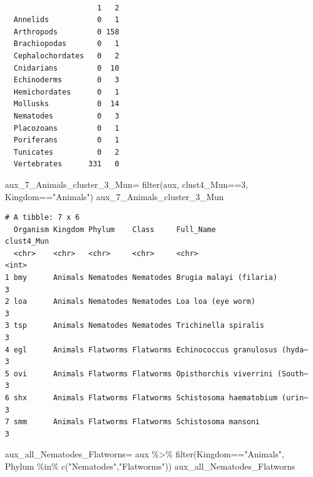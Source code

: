 \documentclass[
  letterpaper,
  DIV=11,
  numbers=noendperiod]{scrreprt}
\newenvironment{Shaded}{}{}
\newcommand{\DecValTok}[1]{\textcolor[rgb]{0.82,0.60,0.40}{#1}}
\newcommand{\FunctionTok}[1]{\textcolor[rgb]{0.38,0.69,0.94}{#1}}
\newcommand{\NormalTok}[1]{\textcolor[rgb]{0.67,0.70,0.75}{#1}}
\newcommand{\OtherTok}[1]{\textcolor[rgb]{0.15,0.68,0.38}{#1}}
\newcommand{\SpecialCharTok}[1]{\textcolor[rgb]{0.34,0.71,0.76}{#1}}
\newcommand{\StringTok}[1]{\textcolor[rgb]{0.60,0.76,0.47}{#1}}
\begin{document}
\begin{verbatim}
                  
                     1   2
  Annelids           0   1
  Arthropods         0 158
  Brachiopodas       0   1
  Cephalochordates   0   2
  Cnidarians         0  10
  Echinoderms        0   3
  Hemichordates      0   1
  Mollusks           0  14
  Nematodes          0   3
  Placozoans         0   1
  Poriferans         0   1
  Tunicates          0   2
  Vertebrates      331   0
\end{verbatim}

\begin{Shaded}
\begin{Highlighting}[]
\NormalTok{aux\_7\_Animals\_cluster\_3\_Mun}\OtherTok{=} \FunctionTok{filter}\NormalTok{(aux,}
\NormalTok{                                clust4\_Mun}\SpecialCharTok{==}\DecValTok{3}\NormalTok{,}
\NormalTok{                                Kingdom}\SpecialCharTok{==}\StringTok{"Animals"}\NormalTok{)}
\NormalTok{aux\_7\_Animals\_cluster\_3\_Mun}
\end{Highlighting}
\end{Shaded}

\begin{verbatim}
# A tibble: 7 x 6
  Organism Kingdom Phylum    Class     Full_Name                      clust4_Mun
  <chr>    <chr>   <chr>     <chr>     <chr>                               <int>
1 bmy      Animals Nematodes Nematodes Brugia malayi (filaria)                 3
2 loa      Animals Nematodes Nematodes Loa loa (eye worm)                      3
3 tsp      Animals Nematodes Nematodes Trichinella spiralis                    3
4 egl      Animals Flatworms Flatworms Echinococcus granulosus (hyda~          3
5 ovi      Animals Flatworms Flatworms Opisthorchis viverrini (South~          3
6 shx      Animals Flatworms Flatworms Schistosoma haematobium (urin~          3
7 smm      Animals Flatworms Flatworms Schistosoma mansoni                     3
\end{verbatim}

\begin{Shaded}
\begin{Highlighting}[]
\NormalTok{aux\_all\_Nematodes\_Flatworns}\OtherTok{=}\NormalTok{ aux }\SpecialCharTok{\%\textgreater{}\%} 
  \FunctionTok{filter}\NormalTok{(Kingdom}\SpecialCharTok{==}\StringTok{"Animals"}\NormalTok{,}
\NormalTok{         Phylum }\SpecialCharTok{\%in\%} \FunctionTok{c}\NormalTok{(}\StringTok{"Nematodes"}\NormalTok{,}\StringTok{"Flatworms"}\NormalTok{))}
\NormalTok{aux\_all\_Nematodes\_Flatworns}
\end{Highlighting}
\end{Shaded}
\end{document}
